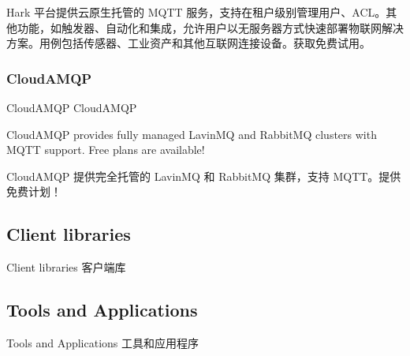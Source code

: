 \documentclass{ctexbook}
\begin{document}
Hark 平台提供云原生托管的 MQTT 服务，支持在租户级别管理用户、ACL。其他功能，如触发器、自动化和集成，允许用户以无服务器方式快速部署物联网解决方案。用例包括传感器、工业资产和其他互联网连接设备。获取免费试用。

\subsubsection{CloudAMQP}
CloudAMQP CloudAMQP

CloudAMQP provides fully managed LavinMQ and RabbitMQ clusters with MQTT support. Free plans are available!

CloudAMQP 提供完全托管的 LavinMQ 和 RabbitMQ 集群，支持 MQTT。提供免费计划！

\subsection{Client libraries}
Client libraries 客户端库

\subsection{Tools and Applications}
Tools and Applications 工具和应用程序
\end{document}
